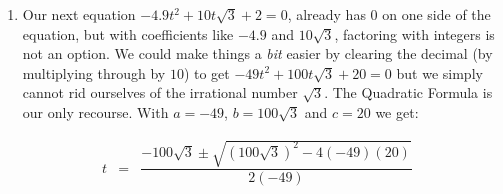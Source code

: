 \documentclass{ximera}
\begin{document}
{{{{{\begin{example}
\begin{enumerate}
\[\begin{array}{rclr}
500 - 420x & = & 59 - 100x^2 & \text{Distribute} \\ [10pt]

500 - 420x - 59 + 100x^2 & = & 0 & \text{Subtract $59$, Add $100x^2$} \\ [10pt]

100x^2 - 420x + 441 & = & 0 & \text{Gather like terms} \\  

\end{array} \]

With highly composite numbers like $100$ and $441$, factoring seems inefficient at best,\footnote{This is actually the Perfect Square Trinomial $(10x - 21)^2$.} so we apply the Quadratic Formula with $a = 100$, $b = -420$ and $c = 441$:\[ \begin{array}{rclr}

x & = & \dfrac{-(-420) \pm \sqrt{(-420)^2 - 4(100)(441)}}{2(100)} & \\ [12pt]

 & = & \dfrac{420 \pm \sqrt{176000 - 176400}}{200} & \\ [12pt]

& = & \dfrac{420 \pm \sqrt{0}}{200} & \\ [12pt]

& = & \dfrac{420 \pm 0}{200} & \\ [12pt]
& = & \dfrac{420}{200} & \\ [12pt]

& = & \dfrac{21}{10} & \\

\end{array} \]

To our surprise and delight we obtain just one answer, $x = \frac{21}{10}$.

\item  Our next equation $-4.9t^2 + 10t\sqrt{3} + 2 = 0$, already has $0$ on one side of the equation, but with coefficients like $-4.9$ and $10\sqrt{3}$, factoring with integers is not an option.  We could make things a \textit{bit} easier by clearing the decimal (by multiplying through by $10$) to get  $-49t^2 + 100t\sqrt{3} + 20 = 0$ but we simply cannot rid ourselves of the irrational number $\sqrt{3}$.  The Quadratic Formula is our only recourse.  With $a = -49$, $b = 100\sqrt{3}$ and $c = 20$ we get: 

\[ \begin{array}{rclr}

t & = &  \dfrac{-100\sqrt{3} \pm \sqrt{(100\sqrt{3})^2 - 4(-49)(20)}}{2(-49)} & \\ [10pt]


\end{array}\]
\end{enumerate}
\end{example}}}}}}
\end{document}
